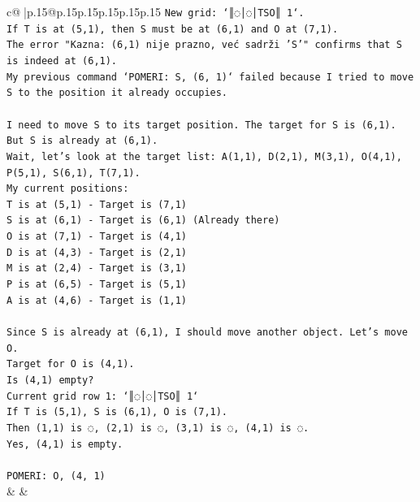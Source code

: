 \documentclass{article}
\begin{document}
{\begin{supertabular}{c@{$\;$}|p{.15\linewidth}@{}p{.15\linewidth}p{.15\linewidth}p{.15\linewidth}p{.15\linewidth}p{.15\linewidth}}
{{{\texttt{New grid: `║◌│◌│TSO║ 1`.} \\
\texttt{If T is at (5,1), then S must be at (6,1) and O at (7,1).} \\
\texttt{The error "Kazna: (6,1) nije prazno, već sadrži 'S'" confirms that S is indeed at (6,1).} \\
\texttt{My previous command `POMERI: S, (6, 1)` failed because I tried to move S to the position it already occupies.} \\
\\ 
\texttt{I need to move S to its target position. The target for S is (6,1). But S is already at (6,1).} \\
\texttt{Wait, let's look at the target list: A(1,1), D(2,1), M(3,1), O(4,1), P(5,1), S(6,1), T(7,1).} \\
\texttt{My current positions:} \\
\texttt{T is at (5,1) {-} Target is (7,1)} \\
\texttt{S is at (6,1) {-} Target is (6,1) (Already there)} \\
\texttt{O is at (7,1) {-} Target is (4,1)} \\
\texttt{D is at (4,3) {-} Target is (2,1)} \\
\texttt{M is at (2,4) {-} Target is (3,1)} \\
\texttt{P is at (6,5) {-} Target is (5,1)} \\
\texttt{A is at (4,6) {-} Target is (1,1)} \\
\\ 
\texttt{Since S is already at (6,1), I should move another object. Let's move O.} \\
\texttt{Target for O is (4,1).} \\
\texttt{Is (4,1) empty?} \\
\texttt{Current grid row 1: `║◌│◌│TSO║ 1`} \\
\texttt{If T is (5,1), S is (6,1), O is (7,1).} \\
\texttt{Then (1,1) is ◌, (2,1) is ◌, (3,1) is ◌, (4,1) is ◌.} \\
\texttt{Yes, (4,1) is empty.} \\
\\ 
\texttt{POMERI: O, (4, 1)} \\
            }
        }
    }
    & & \\ \\


\end{supertabular}}
\end{document}
